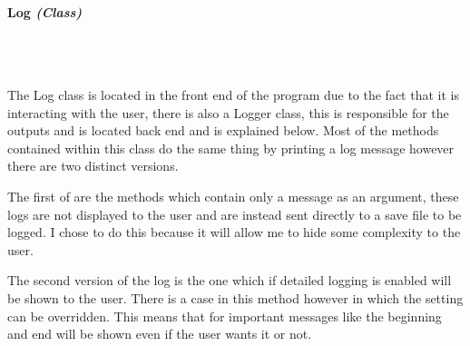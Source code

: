 \begin{FlushLeft}
    \bk

    \paragraph{Log \textit{(Class)}} \mbox{} \\

    \begin{figure}[H]
        \centering
    \end{figure}\\

    The Log class is located in the front end of the program due to the fact that it is interacting with the user, there is also a Logger class, this is responsible for the outputs and is located back end and is explained below. Most of the methods contained within this class do the same thing by printing a log message however there are two distinct versions. \\ \bk

    The first of are the methods which contain only a message as an argument, these logs are not displayed to the user and are instead sent directly to a save file to be logged. I chose to do this because it will allow me to hide some complexity to the user. \\ \bk

    The second version of the log is the one which if detailed logging is enabled will be shown to the user. There is a case in this method however in which the setting can be overridden. This means that for important messages like the beginning and end will be shown even if the user wants it or not. \\ \bk


\end{FlushLeft}
